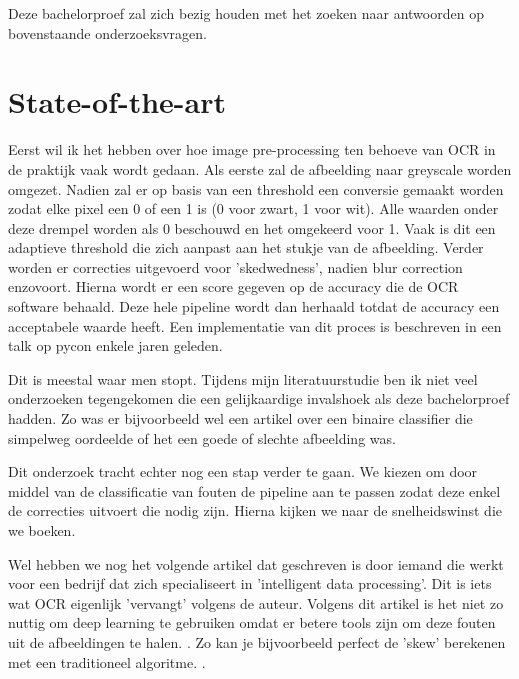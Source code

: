 Deze bachelorproef zal zich bezig houden met het zoeken naar antwoorden op bovenstaande onderzoeksvragen.


\section{State-of-the-art}
\label{sec:state-of-the-art}
 
Eerst wil ik het hebben over hoe image pre-processing ten behoeve van OCR in de praktijk vaak wordt gedaan. Als eerste zal de afbeelding naar greyscale worden omgezet. Nadien zal er op basis van een threshold een conversie gemaakt worden zodat elke pixel een 0 of een 1 is (0 voor zwart, 1 voor wit). Alle waarden onder deze drempel worden als 0 beschouwd en het omgekeerd voor 1. Vaak is dit een adaptieve threshold die zich aanpast aan het stukje van de afbeelding. Verder worden er correcties uitgevoerd voor 'skedwedness', nadien blur correction enzovoort. Hierna wordt er een score gegeven op de accuracy die de OCR software behaald. Deze hele pipeline wordt dan herhaald totdat de accuracy een acceptabele waarde heeft. Een implementatie van dit proces is beschreven in een talk op pycon enkele jaren geleden. \autocite{Chastagnol1954}


Dit is meestal waar men stopt. 
Tijdens mijn literatuurstudie ben ik niet veel onderzoeken tegengekomen die een gelijkaardige invalshoek als deze bachelorproef hadden. Zo was er bijvoorbeeld wel een artikel over een binaire classifier die simpelweg oordeelde of het een goede of slechte afbeelding was.

Dit onderzoek tracht echter nog een stap verder te gaan. We kiezen om door middel van de classificatie van fouten de pipeline aan te passen zodat deze enkel de correcties uitvoert die nodig zijn. Hierna kijken we naar de snelheidswinst die we boeken.

Wel hebben we nog het volgende artikel dat geschreven is door iemand die werkt voor een bedrijf dat zich specialiseert in 'intelligent data processing'. Dit is iets wat OCR eigenlijk 'vervangt' volgens de auteur. Volgens dit artikel is het niet zo nuttig om deep learning te gebruiken omdat er betere tools zijn om deze fouten uit de afbeeldingen te halen. \autocite{Clark2002}. Zo kan je bijvoorbeeld perfect de 'skew' berekenen met een traditioneel algoritme. \autocite{Hull2011}.



